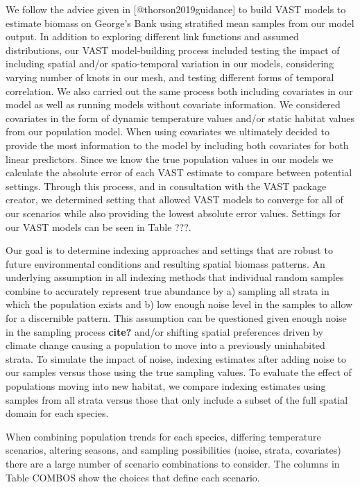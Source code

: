 \documentclass[
]{article}
\begin{document}
We follow the advice given in {[}@thorson2019guidance{]} to build VAST models to estimate biomass on George's Bank using stratified mean samples from our model output. In addition to exploring different link functions and assumed distributions, our VAST model-building process included testing the impact of including spatial and/or spatio-temporal variation in our models, considering varying number of knots in our mesh, and testing different forms of temporal correlation. We also carried out the same process both including covariates in our model as well as running models without covariate information. We considered covariates in the form of dynamic temperature values and/or static habitat values from our population model. When using covariates we ultimately decided to provide the most information to the model by including both covariates for both linear predictors. Since we know the true population values in our models we calculate the absolute error of each VAST estimate to compare between potential settings. Through this process, and in consultation with the VAST package creator, we determined setting that allowed VAST models to converge for all of our scenarios while also providing the lowest absolute error values. Settings for our VAST models can be seen in Table ???.

Our goal is to determine indexing approaches and settings that are robust to future environmental conditions and resulting spatial biomass patterns. An underlying assumption in all indexing methods that individual random samples combine to accurately represent true abundance by a) sampling all strata in which the population exists and b) low enough noise level in the samples to allow for a discernible pattern. This assumption can be questioned given enough noise in the sampling process \textbf{cite?} and/or shifting spatial preferences driven by climate change causing a population to move into a previously uninhabited strata. To simulate the impact of noise, indexing estimates after adding noise to our samples versus those using the true sampling values. To evaluate the effect of populations moving into new habitat, we compare indexing estimates using samples from all strata versus those that only include a subset of the full spatial domain for each species.

When combining population trends for each species, differing temperature scenarios, altering seasons, and sampling possibilities (noise, strata, covariates) there are a large number of scenario combinations to consider. The columns in Table COMBOS show the choices that define each scenario.
\end{document}
